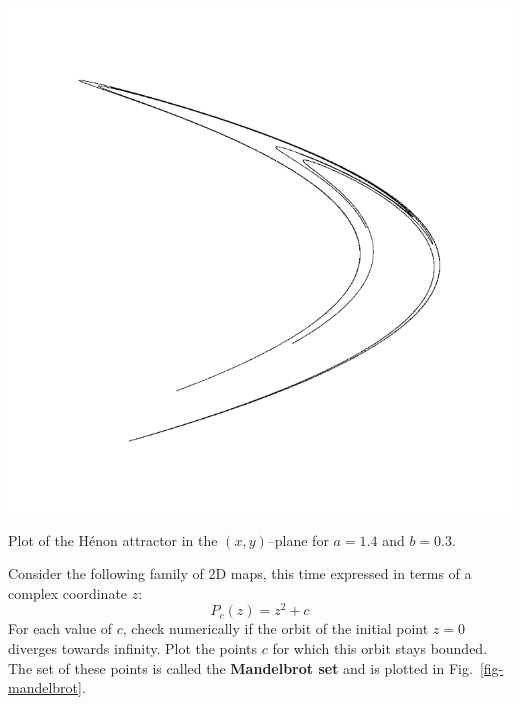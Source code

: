 \begin{marginfigure}
\centering
\includegraphics{dynamic/figures/henon_attractor}
\caption{Plot of the H\'{e}non attractor in the $(x,y)$--plane for $a=1.4$ and $b=0.3$.}
\label{fig-henon-attractor}
\end{marginfigure} 


\begin{exer}
Consider the following family of 2D maps, this time expressed in terms of a complex coordinate $z$:
$$P_c(z)=z^2+c$$
For each value of $c$, check numerically if the orbit of the initial point $z=0$ diverges towards infinity. Plot the points $c$ for which this orbit stays bounded. The set of these points is called the \textbf{Mandelbrot set} and is plotted in Fig.~\ref{fig-mandelbrot}.
\end{exer}


